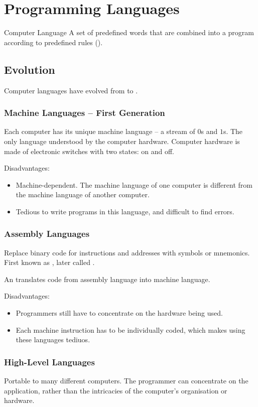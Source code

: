 \documentclass[\main/notes.tex]{subfiles}
\begin{document}
	\setcounter{chapter}{8}
	\chapter{Programming Languages}
		\begin{definition}{Computer Language}
			A set of predefined words that are combined into a program according to predefined rules ().
		\end{definition}
		\section{Evolution}
			Computer languages have evolved from  to .
			\subsection{Machine Languages -- First Generation}
				Each computer has its unique machine language -- a stream of $0$s and $1$s. The only language understood by the computer hardware. Computer hardware is made of electronic switches with two states: on and off.

				Disadvantages:
				\begin{itemize}
					\item Machine-dependent. The machine language of one computer is different from the machine language of another computer.
					\item Tedious to write programs in this language, and difficult to find errors.
				\end{itemize}
			\subsection{Assembly Languages}
				Replace binary code for instructions and addresses with symbols or mnemonics. First known as , later called .

				An  translates code from assembly language into machine language.

				Disadvantages:
				\begin{itemize}
					\item Programmers still have to concentrate on the hardware being used.
					\item Each machine instruction has to be individually coded, which makes using these languages tediuos.
				\end{itemize}
			\subsection{High-Level Languages}
				Portable to many different computers. The programmer can concentrate on the application, rather than the intricacies of the computer's organisation or hardware.
\end{document}
